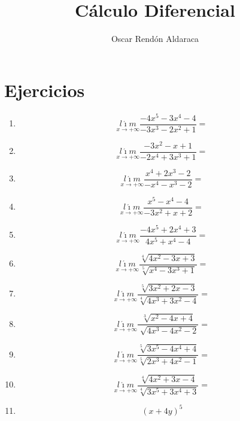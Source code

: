 \documentclass[oneside,spanish,letter]{article}
\begin{document}
\title{Cálculo Diferencial}

\author{Oscar Rendón Aldaraca}

\section{Ejercicios}
\begin{enumerate}
 \item $$\underset{x\rightarrow +\infty}{l\acute{\imath}m} \frac{-4x^5-3x^4-4}{-3x^3-2x^2+1}=$$
 \item $$\underset{x\rightarrow +\infty}{l\acute{\imath}m} \frac{-3x^2-x+1}{-2x^4+3x^3+1}=$$
 \item $$\underset{x\rightarrow +\infty}{l\acute{\imath}m} \frac{x^4+2x^3-2}{-x^4-x^3-2}=$$
 \item $$\underset{x\rightarrow +\infty}{l\acute{\imath}m} \frac{x^5-x^4-4}{-3x^2+x+2}=$$
 \item $$\underset{x\rightarrow +\infty}{l\acute{\imath}m} \frac{-4x^5+2x^4+3}{4x^5+x^4-4}=$$
 \item $$\underset{x\rightarrow +\infty}{l\acute{\imath}m} \frac{\sqrt[4]{4x^2-3x+3}}{\sqrt[5]{x^4-3x^3+1}}=$$
 \item $$\underset{x\rightarrow +\infty}{l\acute{\imath}m} \frac{\sqrt[5]{3x^2+2x-3}}{\sqrt[4]{4x^3+3x^2-4}}=$$
 \item $$\underset{x\rightarrow +\infty}{l\acute{\imath}m} \frac{\sqrt[3]{x^2-4x+4}}{\sqrt[]{4x^3-4x^2-2}}=$$
 \item $$\underset{x\rightarrow +\infty}{l\acute{\imath}m} \frac{\sqrt[5]{3x^5-4x^4+4}}{\sqrt[5]{2x^3+4x^2-1}}=$$
 \item $$\underset{x\rightarrow +\infty}{l\acute{\imath}m} \frac{\sqrt[4]{4x^2+3x-4}}{\sqrt[4]{3x^5+3x^4+3}}=$$
\item $$(x+4y)^5$$
 \end{enumerate}
  \newpage
\end{document}

